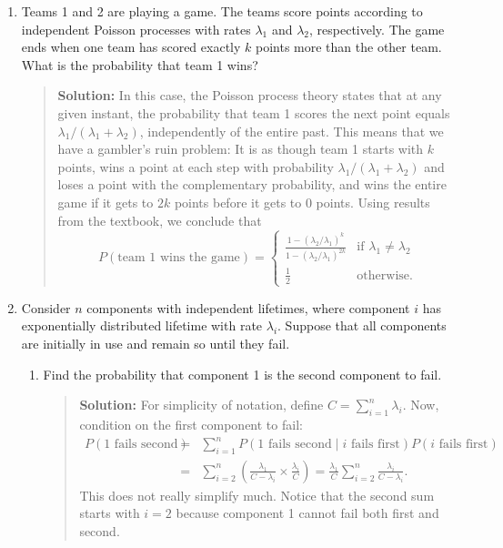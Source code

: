\documentclass{article}
\begin{document}
\begin{enumerate}
\item Teams 1 and 2 are playing a game. The teams score points according to
independent Poisson processes with rates $\lambda_1$ and $\lambda_2$,
respectively. The game ends when one team has scored exactly $k$ points more
than the other team. What is the probability that team 1 wins?
  \begin{quotation}{\bf Solution:}
  In this case, the Poisson process theory states that at any given instant, the probability
  that team 1 scores the next point equals $\lambda_1/(\lambda_1+\lambda_2)$,
  independently of the entire past.  This means that we have a gambler's ruin problem:
  It is as though team 1 starts with $k$ points, wins a point at each step with probability
  $\lambda_1/(\lambda_1+\lambda_2)$ and loses a point with the complementary probability, 
  and wins the entire game if it gets to
  $2k$ points before it gets to 0 points.  Using results from the textbook, we conclude that
  \[
  P(\mbox{team 1 wins the game}) = 
  \begin{cases}
  \frac{1 - (\lambda_2/\lambda_1)^k}{1 - (\lambda_2/\lambda_1)^{2k}} & 
  \mbox{if $\lambda_1\ne\lambda_2$} \\
  \frac12 & \mbox{otherwise}.
  \end{cases}
  \]
  
  \end{quotation}

\item Consider $n$ components with independent lifetimes, where component $i$
has exponentially distributed lifetime with rate $\lambda_i$. Suppose that all
components are initially in use and remain so until they fail.

  \begin{enumerate}

  \item Find the probability that component 1 is the second component to fail.
  \begin{quotation}{\bf Solution:}
  For simplicity of notation, define $C=\sum_{i=1}^n \lambda_i$.
  Now, condition on the first component to fail:
  \begin{eqnarray*}
  P(\mbox{1 fails second}) &=& \sum_{i=1}^n 
  P(\mbox{1 fails second} \mid \mbox{$i$ fails first}) P(\mbox{$i$ fails first}) \\
  &=& 
  \sum_{i=2}^n \left ( \frac{\lambda_1}{C-\lambda_i} \times \frac{\lambda_i}{C} \right)
  = \frac{\lambda_1}{C} \sum_{i=2}^n \frac{\lambda_i}{C-\lambda_i}.
  \end{eqnarray*}
  This does not really simplify much.  Notice that the second sum starts with $i=2$
  because component 1 cannot fail both first and second.
  \end{quotation}


\end{enumerate}
\end{enumerate}
\end{document}

